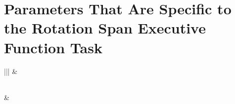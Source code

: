\documentclass[letterpaper,10pt,english]{sphinxmanual}
\begin{document}
\section{Parameters That Are Specific to the Rotation Span Executive Function Task}
\label{\detokenize{Data_Definations_Phase1B:parameters-that-are-specific-to-the-rotation-span-executive-function-task}}

\begin{savenotes}\sphinxatlongtablestart\begin{longtable}{|*{2}{|}}
\hline
{}\relax &\relax \\
\hline
\endfirsthead

%
{}\\
\hline
{}\relax &\relax \\
\hline
\endhead

\hline
{}\\
\endfoot

\endlastfoot


\end{longtable}
\end{savenotes}
\end{document}

